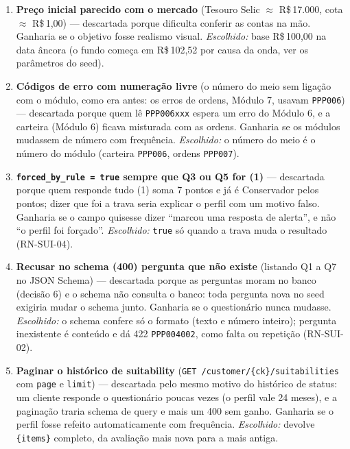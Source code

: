 \documentclass[11pt,a4paper]{article}
\newcommand{\rs}{R\$\,}
\newcommand{\tb}[1]{\texttt{#1}}           %
\begin{document}
\begin{enumerate}
  logo depois do \tb{docker compose up}, sem fechar nenhum dia. \emph{Escolhido:} o seed grava só
  o preço de hoje; os dias seguintes entram pelo fechamento, que só abre dias úteis, e a RN-PRO-04
  cobre os dias sem linha.
  \item \textbf{Preço inicial parecido com o mercado} (Tesouro Selic $\approx$ \rs 17.000, cota
  $\approx$ \rs 1,00) --- descartada porque dificulta conferir as contas na mão. Ganharia se o
  objetivo fosse realismo visual. \emph{Escolhido:} base \rs 100,00 na data âncora (o fundo
  começa em \rs 102,52 por causa da onda, ver os parâmetros do seed).
  \item \textbf{Códigos de erro com numeração livre} (o número do meio sem ligação com o módulo,
  como era antes: os erros de ordens, Módulo 7, usavam \tb{PPP006}) --- descartada porque quem lê
  \tb{PPP006xxx} espera um erro do Módulo 6, e a carteira (Módulo 6) ficava misturada com as
  ordens. Ganharia se os módulos mudassem de número com frequência. \emph{Escolhido:} o número do
  meio é o número do módulo (carteira \tb{PPP006}, ordens \tb{PPP007}).
  \item \textbf{\tb{forced_by_rule = true} sempre que Q3 ou Q5 for (1)} --- descartada porque quem
  responde tudo (1) soma 7 pontos e já é Conservador pelos pontos; dizer que foi a trava seria
  explicar o perfil com um motivo falso. Ganharia se o campo quisesse dizer ``marcou uma resposta de
  alerta'', e não ``o perfil foi forçado''. \emph{Escolhido:} \tb{true} só quando a trava muda o
  resultado (RN-SUI-04).
  \item \textbf{Recusar no schema (400) pergunta que não existe} (listando Q1 a Q7 no JSON Schema)
  --- descartada porque as perguntas moram no banco (decisão 6) e o schema não consulta o banco:
  toda pergunta nova no seed exigiria mudar o schema junto. Ganharia se o questionário nunca
  mudasse. \emph{Escolhido:} o schema confere só o formato (texto e número inteiro); pergunta
  inexistente é conteúdo e dá 422 \tb{PPP004002}, como falta ou repetição (RN-SUI-02).
  \item \textbf{Paginar o histórico de suitability} (\tb{GET /customer/\{ck\}/suitabilities} com
  \tb{page} e \tb{limit}) --- descartada pelo mesmo motivo do histórico de status: um cliente
  responde o questionário poucas vezes (o perfil vale 24 meses), e a paginação traria schema de
  query e mais um 400 sem ganho. Ganharia se o perfil fosse refeito automaticamente com frequência.
  \emph{Escolhido:} devolve \tb{\{items\}} completo, da avaliação mais nova para a mais antiga.

\end{enumerate}
\end{document}
